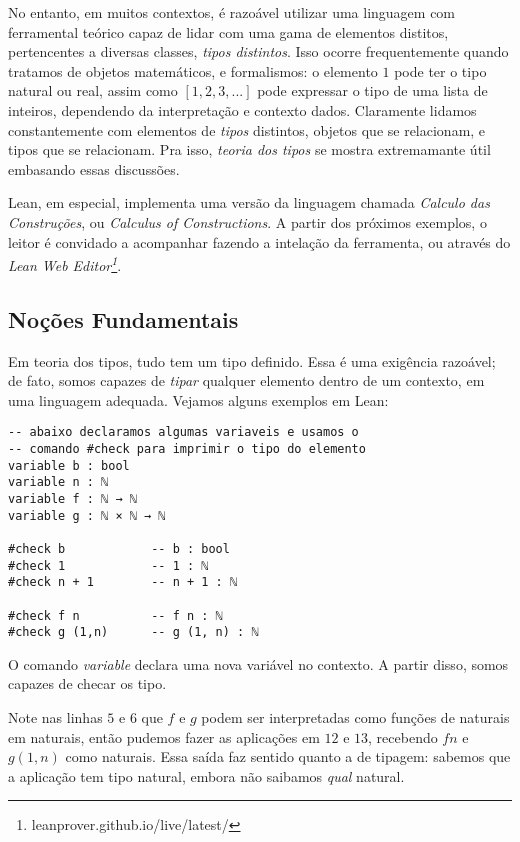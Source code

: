 No entanto, em muitos contextos, é razoável utilizar uma linguagem com ferramental teórico capaz de lidar com uma gama de elementos distitos, pertencentes a diversas classes, \textit{tipos distintos}.
Isso ocorre frequentemente quando tratamos de objetos matemáticos, e formalismos: o elemento $1$ pode ter o tipo natural ou real, assim como $[1,2,3, ...]$ pode expressar o tipo de uma lista de inteiros, dependendo da interpretação e contexto dados.
Claramente lidamos constantemente com elementos de \textit{tipos} distintos, objetos que se relacionam, e tipos que se relacionam.
Pra isso, \textit{teoria dos tipos} se mostra extremamante útil embasando essas discussões.

Lean, em especial, implementa uma versão da linguagem chamada \textit{Calculo das Construções}, ou \textit{Calculus of Constructions}. A partir dos próximos exemplos, o leitor é convidado a acompanhar fazendo a intelação da ferramenta, ou através do \textit{Lean Web Editor\footnote{leanprover.github.io/live/latest/}}.

\subsection{Noções Fundamentais}
Em teoria dos tipos, tudo tem um tipo definido. Essa é uma exigência razoável; de fato, somos capazes de \textit{tipar} qualquer elemento dentro de um contexto, em uma linguagem adequada. Vejamos alguns exemplos em Lean:

\vspace{5mm}
\begin{lstlisting}
-- abaixo declaramos algumas variaveis e usamos o
-- comando #check para imprimir o tipo do elemento
variable b : bool
variable n : ℕ
variable f : ℕ → ℕ
variable g : ℕ × ℕ → ℕ

#check b            -- b : bool
#check 1            -- 1 : ℕ
#check n + 1        -- n + 1 : ℕ

#check f n          -- f n : ℕ
#check g (1,n)      -- g (1, n) : ℕ
\end{lstlisting}
\vspace{5mm}

\noindent O comando \textit{variable} declara uma nova variável no contexto.
A partir disso, somos capazes de checar os tipo.

Note nas linhas $5$ e $6$ que $f$ e $g$ podem ser interpretadas como funções de naturais em naturais, então pudemos fazer as aplicações em $12$ e $13$, recebendo $f n$ e $g (1,n)$ como naturais.
Essa saída faz sentido quanto a de tipagem: sabemos que a aplicação tem tipo natural, embora não saibamos \textit{qual} natural.

